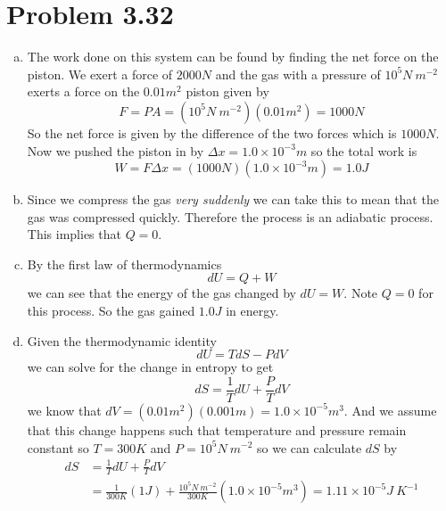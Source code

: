\documentclass[11pt]{article}
\numberwithin{equation}{section}
\begin{document}
\section{Problem 3.32}
\begin{enumerate}[(a)]
\item
The work done on this system can be found by finding the net force on the piston. We exert a force of $2000\unit{N}$ and the gas with a pressure of $10^{5}\unit{N\ m^{-2}}$ exerts a force on the $0.01\unit{m^{2}}$ piston given by
$$F = PA = (10^{5}\unit{N\ m^{-2}})(0.01\unit{m^{2}}) = 1000\unit{N}$$
So the net force is given by the difference of the two forces which is $1000\unit{N}$. Now we pushed the piston in by $\Delta x = 1.0\times10^{-3}\unit{m}$ so the total work is
$$W = F\Delta x = (1000\unit{N})(1.0\times10^{-3}\unit{m}) = 1.0\unit{J}$$

\item
Since we compress the gas \emph{very suddenly} we can take this to mean that the gas was compressed quickly. Therefore the process is an adiabatic process. This implies that $Q=0$.

\item
By the first law of thermodynamics 
$$dU = Q + W$$
we can see that the energy of the gas changed by $dU = W$. Note $Q=0$ for this process. So the gas gained $1.0\unit{J}$ in energy.

\item
Given the thermodynamic identity
$$dU = TdS - PdV$$
we can solve for the change in entropy to get
$$dS = \frac{1}{T}dU + \frac{P}{T}dV$$
we know that $dV = (0.01\unit{m^{2}})(0.001\unit{m}) = 1.0\times10^{-5}\unit{m^3}$. And we assume that this change happens such that temperature and pressure remain constant so $T=300\unit{K}$ and $P=10^5\unit{N\ m^{-2}}$ so we can calculate $dS$ by 
\begin{align*}
dS &= \frac{1}{T}dU + \frac{P}{T}dV\\
&= \frac{1}{300\unit{K}}(1\unit{J}) + \frac{10^{5}\unit{N\ m^{-2}}}{300\unit{K}}(1.0\times10^{-5}\unit{m^3}) = 1.11\times10^{-5}\unit{J\ K^{-1}}
\end{align*}
\end{enumerate}
\end{document}
